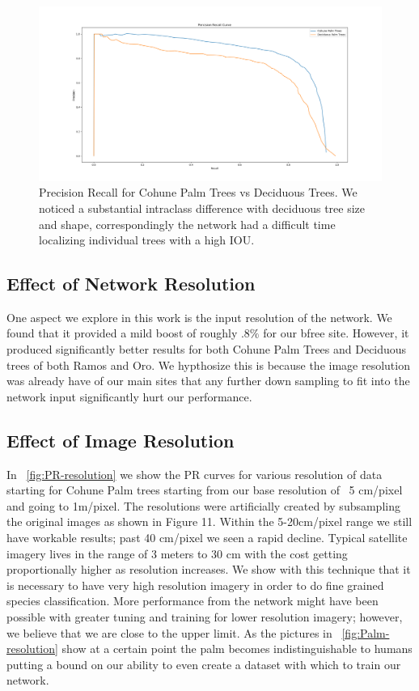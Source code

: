 \begin{figure}[ht]
\includegraphics[width=1.0\textwidth]{Figures/PR-palm-deciduous-bfree.png}
\caption{Precision Recall for Cohune Palm Trees vs Deciduous Trees. We noticed a substantial intraclass difference with deciduous tree size and shape, correspondingly the network had a difficult time localizing individual trees with a high IOU.}
\label{fig:PR-palm-deciduous-bfree}
\end{figure}

\subsection{Effect of Network Resolution}

One aspect we explore in this work is the input resolution of the network. We found that it provided a mild boost of roughly $.8\%$ for our bfree site. However, it produced significantly better results for both Cohune Palm Trees and Deciduous trees of both Ramos and Oro. We hypthosize this is because the image resolution was already have of our main sites that any further down sampling to fit into the network input significantly hurt our performance.


\subsection{Effect of Image Resolution}

In ~\ref{fig:PR-resolution} we show the PR curves for various resolution of data starting for Cohune Palm trees starting from our base resolution of ~5 cm/pixel and going to 1m/pixel. The resolutions were artificially created by subsampling the original images as shown in Figure 11. Within the 5-20cm/pixel range we still have workable results; past 40 cm/pixel we seen a rapid decline. Typical satellite imagery lives in the range of 3 meters to 30 cm with the cost getting proportionally higher as resolution increases. We show with this technique that it is necessary to have very high resolution imagery in order to do fine grained species classification. More performance from the network might have been possible with greater tuning and training for lower resolution imagery; however, we believe that we are close to the upper limit. As the pictures in ~\ref{fig:Palm-resolution} show at a certain point the palm becomes indistinguishable to humans putting a bound on our ability to even create a dataset with which to train our network.

